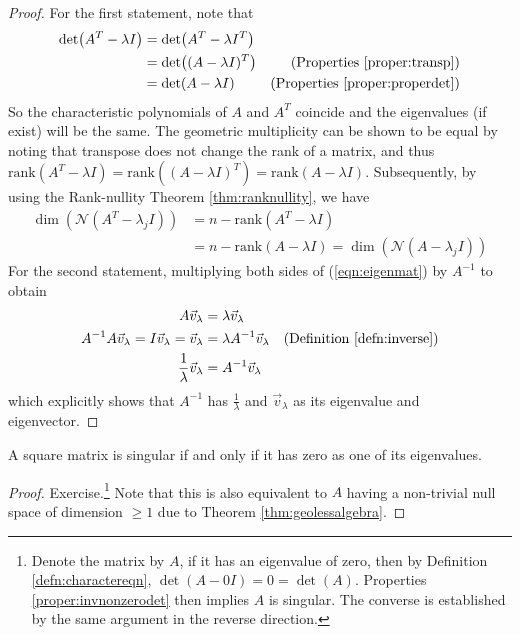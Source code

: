 \begin{proof}
For the first statement, note that
\begin{align*}
\det(A^T -\lambda I) &= \det(A^T - \lambda I^T) \\
&= \det((A - \lambda I)^T) & \text{(Properties \ref{proper:transp})} \\
&= \det(A - \lambda I) & \text{(Properties \ref{proper:properdet})}
\end{align*}
So the characteristic polynomials of $A$ and $A^T$ coincide and the eigenvalues (if exist) will be the same. The geometric multiplicity can be shown to be equal by noting that transpose does not change the rank of a matrix, and thus $\text{rank}(A^T - \lambda I) = \text{rank}((A - \lambda I)^T) = \text{rank}(A - \lambda I)$. Subsequently, by using the Rank-nullity Theorem \ref{thm:ranknullity}, we have
\begin{align*}
\dim(\mathcal{N}(A^T-\lambda_j I)) &= n - \text{rank}(A^T - \lambda I) \\
&= n - \text{rank}(A - \lambda I) = \dim(\mathcal{N}(A-\lambda_j I))
\end{align*}
For the second statement, multiplying both sides of (\ref{eqn:eigenmat}) by $A^{-1}$ to obtain
\begin{align*}
A\vec{v}_\lambda &= \lambda\vec{v}_\lambda \\
A^{-1}A\vec{v}_\lambda = I\vec{v}_\lambda = \vec{v}_\lambda &= \lambda A^{-1}\vec{v}_\lambda & \text{(Definition \ref{defn:inverse})}\\
\frac{1}{\lambda}\vec{v}_\lambda &= A^{-1}\vec{v}_\lambda 
\end{align*}
which explicitly shows that $A^{-1}$ has $\frac{1}{\lambda}$ and $\vec{v}_\lambda$ as its eigenvalue and eigenvector.
\end{proof}
\begin{thm}
\label{thm:singularzeroeig}
A square matrix is singular if and only if it has zero as one of its eigenvalues.
\end{thm}
\begin{proof}
Exercise.\footnote{Denote the matrix by $A$, if it has an eigenvalue of zero, then by Definition \ref{defn:charactereqn}, $\det(A-0I) = 0 = \det(A)$. Properties \ref{proper:invnonzerodet} then implies $A$ is singular. The converse is established by the same argument in the reverse direction.} Note that this is also equivalent to $A$ having a non-trivial null space of dimension $\geq 1$ due to Theorem \ref{thm:geolessalgebra}.
\end{proof}

